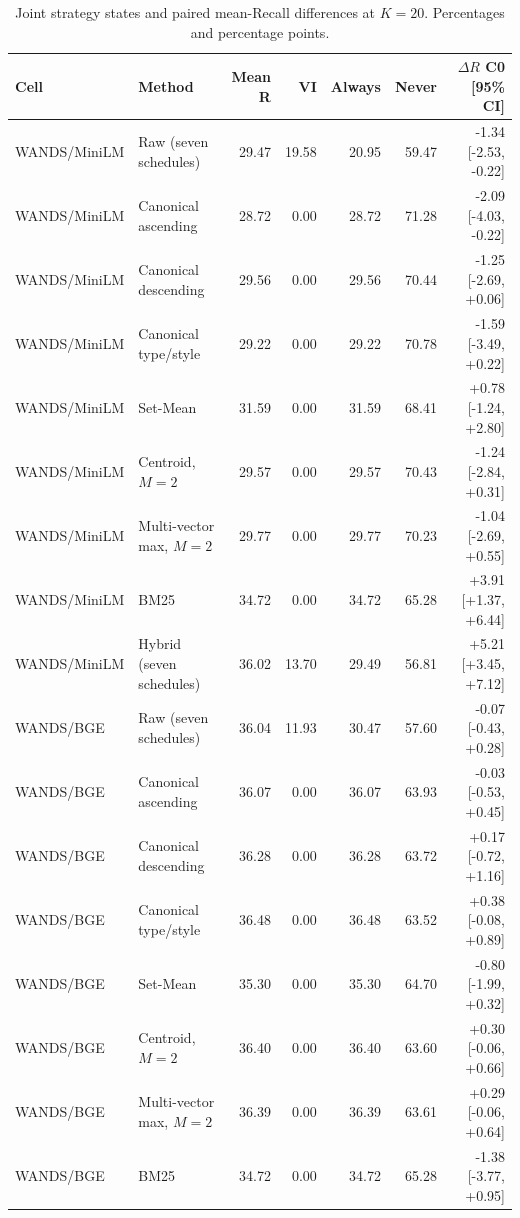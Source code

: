 \begin{table}[t]
\centering
\small
\setlength{\tabcolsep}{4pt}
\caption{Joint strategy states and paired mean-Recall differences at $K=20$. Percentages and percentage points.}
\label{tab:joint_states20}
\begin{tabular}{llrrrrr}
\toprule
Cell & Method & Mean R & VI & Always & Never & $\Delta R$ C0 [95\% CI] \\
\midrule
WANDS/MiniLM & Raw (seven schedules) & 29.47 & 19.58 & 20.95 & 59.47 & -1.34 [-2.53, -0.22] \\
WANDS/MiniLM & Canonical ascending & 28.72 & 0.00 & 28.72 & 71.28 & -2.09 [-4.03, -0.22] \\
WANDS/MiniLM & Canonical descending & 29.56 & 0.00 & 29.56 & 70.44 & -1.25 [-2.69, +0.06] \\
WANDS/MiniLM & Canonical type/style & 29.22 & 0.00 & 29.22 & 70.78 & -1.59 [-3.49, +0.22] \\
WANDS/MiniLM & Set-Mean & 31.59 & 0.00 & 31.59 & 68.41 & +0.78 [-1.24, +2.80] \\
WANDS/MiniLM & Centroid, $M=2$ & 29.57 & 0.00 & 29.57 & 70.43 & -1.24 [-2.84, +0.31] \\
WANDS/MiniLM & Multi-vector max, $M=2$ & 29.77 & 0.00 & 29.77 & 70.23 & -1.04 [-2.69, +0.55] \\
WANDS/MiniLM & BM25 & 34.72 & 0.00 & 34.72 & 65.28 & +3.91 [+1.37, +6.44] \\
WANDS/MiniLM & Hybrid (seven schedules) & 36.02 & 13.70 & 29.49 & 56.81 & +5.21 [+3.45, +7.12] \\
WANDS/BGE & Raw (seven schedules) & 36.04 & 11.93 & 30.47 & 57.60 & -0.07 [-0.43, +0.28] \\
WANDS/BGE & Canonical ascending & 36.07 & 0.00 & 36.07 & 63.93 & -0.03 [-0.53, +0.45] \\
WANDS/BGE & Canonical descending & 36.28 & 0.00 & 36.28 & 63.72 & +0.17 [-0.72, +1.16] \\
WANDS/BGE & Canonical type/style & 36.48 & 0.00 & 36.48 & 63.52 & +0.38 [-0.08, +0.89] \\
WANDS/BGE & Set-Mean & 35.30 & 0.00 & 35.30 & 64.70 & -0.80 [-1.99, +0.32] \\
WANDS/BGE & Centroid, $M=2$ & 36.40 & 0.00 & 36.40 & 63.60 & +0.30 [-0.06, +0.66] \\
WANDS/BGE & Multi-vector max, $M=2$ & 36.39 & 0.00 & 36.39 & 63.61 & +0.29 [-0.06, +0.64] \\
WANDS/BGE & BM25 & 34.72 & 0.00 & 34.72 & 65.28 & -1.38 [-3.77, +0.95] \\

\end{tabular}
\end{table}
